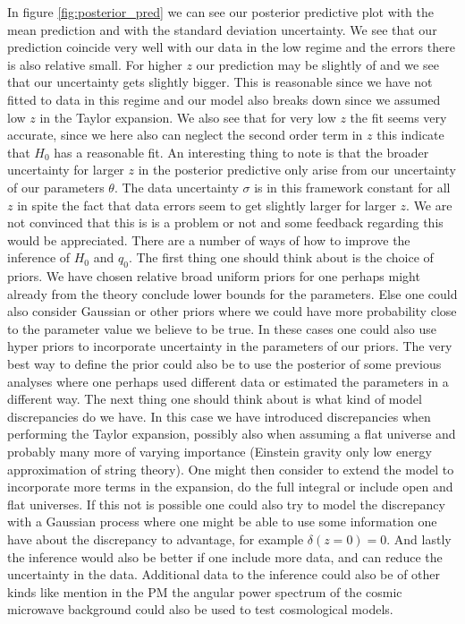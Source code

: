 \documentclass[11pt,a4paper]{article}
\begin{document}
In figure \ref{fig:posterior_pred} we can see our posterior predictive plot with the mean prediction and with the standard deviation uncertainty. We see that our prediction coincide very well with our data in the low regime and the errors there is also relative small. For higher $z$ our prediction may be slightly of and we see that our uncertainty gets slightly bigger. This is reasonable since we have not fitted to data in this regime and our model also breaks down since we assumed low $z$ in the Taylor expansion. We also see that for very low $z$ the fit seems very accurate, since we here also can neglect the second order term in $z$ this indicate that $H_0$ has a reasonable fit. An interesting thing to note is that the broader uncertainty for larger $z$ in the posterior predictive only arise from our uncertainty of our parameters $\theta$. The data uncertainty $\sigma$ is in this framework constant for all $z$ in spite the fact that data errors seem to get slightly larger for larger $z$. We are not convinced that this is is a problem or not and some feedback regarding this would be appreciated.
There are a number of ways of how to improve the inference of $H_0$ and $q_0$. The first thing one should think about is the choice of priors. We have chosen relative broad uniform priors for one perhaps might already from the theory conclude lower bounds for the parameters. Else one could also consider Gaussian or other priors where we could have more probability close to the parameter value we believe to be true. In these cases one could also use hyper priors to incorporate uncertainty in the parameters of our priors. The very best way to define the prior could also be to use the posterior of some previous analyses where one perhaps used different data or estimated the parameters in a different way. The next thing one should think about is what kind of model discrepancies do we have. In this case we have introduced discrepancies when performing the Taylor expansion, possibly also when assuming a flat universe and probably many more of varying importance (Einstein gravity only low energy approximation of string theory). One might then consider to extend the model to incorporate more terms in the expansion, do the full integral or include open and flat universes. If this not is possible one could also try to model the discrepancy with a Gaussian process where one might be able to use some information one have about the discrepancy to advantage, for example $\delta(z = 0) = 0$. And lastly the inference would also be better if one include more data, and can reduce the uncertainty in the data. Additional data to the inference could also be of other kinds like mention in the PM the angular power spectrum of the cosmic microwave background could also be used to test cosmological models. 
\end{document}
